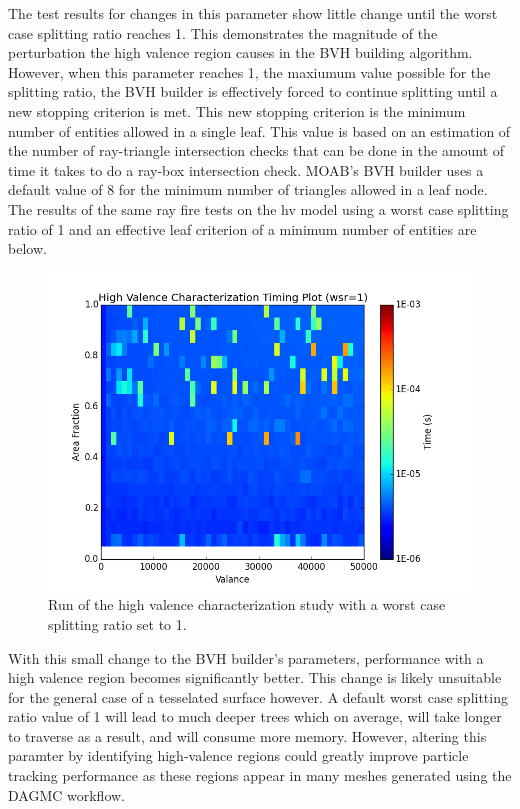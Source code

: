 \documentclass[12pt, a4paper]{article}
\begin{document}
  The test results for changes in this parameter show little change until the worst case splitting ratio reaches 1. This demonstrates the magnitude of the  perturbation the high valence region causes in the BVH building algorithm. However, when this parameter reaches 1, the maxiumum value possible for the splitting ratio, the BVH builder is effectively forced to continue splitting until a new stopping criterion is met. This new stopping criterion is the minimum number of entities allowed in a single leaf. This value is based on an estimation of the number of ray-triangle intersection checks that can be done in the amount of time it takes to do a ray-box intersection check. MOAB's BVH builder uses a default value of 8 for the minimum number of triangles allowed in a leaf node. The results of the same ray fire tests on the hv model using a worst case splitting ratio of 1 and an effective leaf criterion of a minimum number of entities are below.

  
\begin{figure}[H]
  \centering
    \includegraphics[scale=0.55]{hv_study_MOAB_wsr1.png}
    \caption{Run of the high valence characterization study with a worst case splitting ratio set to 1.}
\end{figure}


With this small change to the BVH builder's parameters, performance with a high valence region becomes significantly better. This change is likely unsuitable for the general case of a tesselated surface however. A default worst case splitting ratio value of 1 will lead to much deeper trees which on average, will take longer to traverse as a result, and will consume more memory. However, altering this paramter by identifying high-valence regions could greatly improve particle tracking performance as these regions appear in many meshes generated using the DAGMC workflow.
\end{document}
